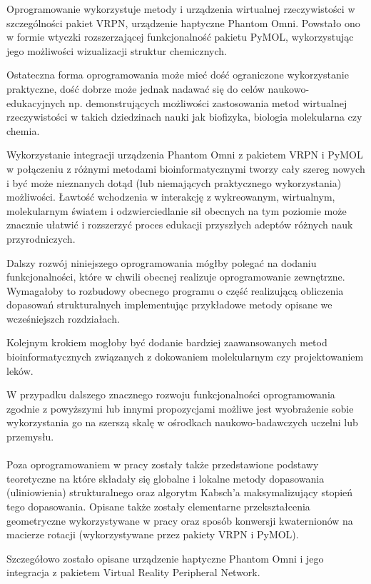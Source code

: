 \documentclass[licencjacka]{pracamgr}
\begin{document}
Oprogramowanie wykorzystuje metody i urządzenia wirtualnej rzeczywistości w szczególności pakiet VRPN, urządzenie haptyczne Phantom Omni. Powstało ono w formie wtyczki rozszerzającej funkcjonalność pakietu PyMOL, wykorzystując jego możliwości wizualizacji struktur chemicznych.

Ostateczna forma oprogramowania może mieć dość ograniczone wykorzystanie praktyczne, dość dobrze może jednak nadawać się do celów naukowo-edukacyjnych np. demonstrujących możliwości zastosowania metod wirtualnej rzeczywistości w takich dziedzinach nauki jak biofizyka, biologia molekularna czy chemia.

Wykorzystanie integracji urządzenia Phantom Omni z pakietem VRPN i PyMOL w połączeniu z różnymi metodami bioinformatycznymi tworzy cały szereg nowych i być może nieznanych dotąd (lub niemających praktycznego wykorzystania) możliwości. Ławtość wchodzenia w interakcję z wykreowanym, wirtualnym, molekularnym światem i odzwierciedlanie sił obecnych na tym poziomie może znacznie ułatwić i rozszerzyć proces edukacji przyszłych adeptów różnych nauk przyrodniczych.

Dalszy rozwój niniejszego oprogramowania mógłby polegać na dodaniu funkcjonalności, które w chwili obecnej realizuje oprogramowanie zewnętrzne. Wymagałoby to rozbudowy obecnego programu o część realizującą obliczenia dopasowań strukturalnych implementując przykładowe metody opisane we wcześniejszch rozdziałach. 

Kolejnym krokiem mogłoby być dodanie bardziej zaawansowanych metod bioinformatycznych związanych z dokowaniem molekularnym czy projektowaniem leków.

W przypadku dalszego znacznego rozwoju funkcjonalności oprogramowania zgodnie z powyższymi lub innymi propozycjami możliwe jest wyobrażenie sobie wykorzystania go na szerszą skalę w ośrodkach naukowo-badawczych uczelni lub przemysłu.
\\
\\
Poza oprogramowaniem w pracy zostały także przedstawione podstawy teoretyczne na które składały się globalne i lokalne metody dopasowania (uliniowienia) strukturalnego oraz algorytm Kabsch'a maksymalizujący stopień tego dopasowania. Opisane także zostały elementarne przekształcenia geometryczne wykorzystywane w pracy oraz sposób konwersji kwaternionów na macierze rotacji (wykorzystywane przez pakiety VRPN i PyMOL).

Szczegółowo zostało opisane urządzenie haptyczne Phantom Omni i jego integracja z pakietem Virtual Reality Peripheral Network.
\end{document}
